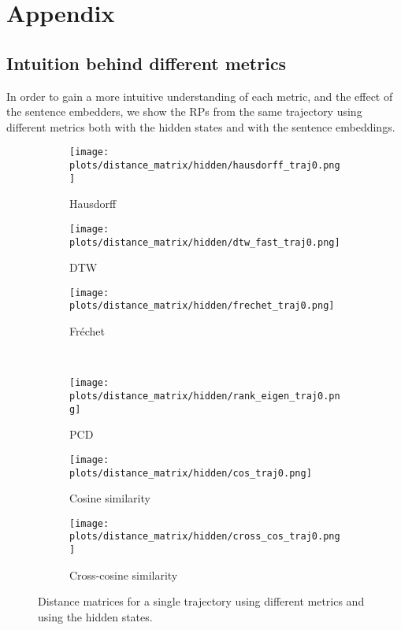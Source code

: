\documentclass[a4paper,12pt]{article}
\begin{document}
\newpage
\printbibliography


\section{Appendix}
\label{sec:appendix}

\subsection{Intuition behind different metrics}
\label{subsec:appendix_intuition_metrics}

In order to gain a more intuitive understanding of each metric, and the effect of the sentence embedders, we show the RPs from the same trajectory using different metrics both with the hidden states and with the sentence embeddings.

\begin{figure}[H]
    \centering
    \begin{subfigure}[b]{0.32\textwidth}
        \centering
        \texttt{[image: plots/distance\_matrix/hidden/hausdorff\_traj0.png]}
        \caption{Hausdorff}
    \end{subfigure}
    \begin{subfigure}[b]{0.32\textwidth}
        \centering
        \texttt{[image: plots/distance\_matrix/hidden/dtw\_fast\_traj0.png]}
        \caption{DTW}
    \end{subfigure}
    \begin{subfigure}[b]{0.32\textwidth}
        \centering
        \texttt{[image: plots/distance\_matrix/hidden/frechet\_traj0.png]}
        \caption{Fréchet}
    \end{subfigure}
    \\[0.5em]
    \begin{subfigure}[b]{0.32\textwidth}
        \centering
        \texttt{[image: plots/distance\_matrix/hidden/rank\_eigen\_traj0.png]}
        \caption{PCD}
    \end{subfigure}
    \begin{subfigure}[b]{0.32\textwidth}
        \centering
        \texttt{[image: plots/distance\_matrix/hidden/cos\_traj0.png]}
        \caption{Cosine similarity}
    \end{subfigure}
    \begin{subfigure}[b]{0.32\textwidth}
        \centering
        \texttt{[image: plots/distance\_matrix/hidden/cross\_cos\_traj0.png]}
        \caption{Cross-cosine similarity}
    \end{subfigure}
    \caption{Distance matrices for a single trajectory using different metrics and using the hidden states.}
    \label{fig:distance_metrics_comparison_hidden}
\end{figure}
\end{document}
